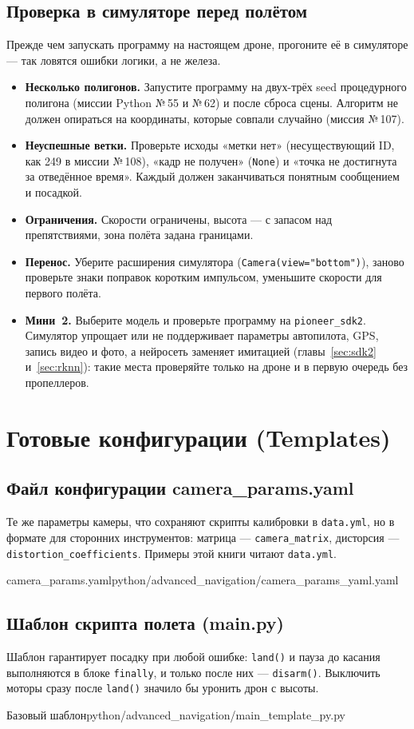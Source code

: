 \subsection{Проверка в симуляторе перед полётом}
Прежде чем запускать программу на настоящем дроне, прогоните её в симуляторе --- так ловятся ошибки логики, а не железа.
\begin{itemize}
    \item \textbf{Несколько полигонов.} Запустите программу на двух-трёх seed процедурного полигона (миссии Python №\,55 и №\,62) и после сброса сцены. Алгоритм не должен опираться на координаты, которые совпали случайно (миссия №\,107).
    \item \textbf{Неуспешные ветки.} Проверьте исходы «метки нет» (несуществующий ID, как 249 в миссии №\,108), «кадр не получен» (\texttt{None}) и «точка не достигнута за отведённое время». Каждый должен заканчиваться понятным сообщением и посадкой.
    \item \textbf{Ограничения.} Скорости ограничены, высота --- с запасом над препятствиями, зона полёта задана границами.
    \item \textbf{Перенос.} Уберите расширения симулятора (\texttt{Camera(view="bottom")}), заново проверьте знаки поправок коротким импульсом, уменьшите скорости для первого полёта.
    \item \textbf{Мини~2.} Выберите модель  и проверьте программу на \texttt{pioneer\_sdk2}. Симулятор упрощает или не поддерживает параметры автопилота, GPS, запись видео и фото, а нейросеть заменяет имитацией (главы~\ref{sec:sdk2} и~\ref{sec:rknn}): такие места проверяйте только на дроне и в первую очередь без пропеллеров.
\end{itemize}

\section{Готовые конфигурации (Templates)}

\subsection{Файл конфигурации camera\_params.yaml}
Те же параметры камеры, что сохраняют скрипты калибровки в \texttt{data.yml}, но в формате для сторонних инструментов: матрица --- \texttt{camera\_matrix}, дисторсия --- \texttt{distortion\_coefficients}. Примеры этой книги читают \texttt{data.yml}.
\begin{codefiletitle}[yaml]{camera_params.yaml}{python/advanced_navigation/camera_params_yaml.yaml}
\end{codefiletitle}

\subsection{Шаблон скрипта полета (main.py)}
Шаблон гарантирует посадку при любой ошибке: \texttt{land()} и пауза до касания выполняются в блоке \texttt{finally}, и только после них --- \texttt{disarm()}. Выключить моторы сразу после \texttt{land()} значило бы уронить дрон с высоты.
\begin{codefiletitle}[python]{Базовый шаблон}{python/advanced_navigation/main_template_py.py}
\end{codefiletitle}

